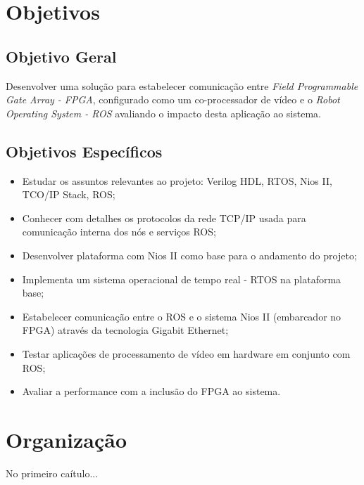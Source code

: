 \section{Objetivos}

\subsection{Objetivo Geral}

Desenvolver uma solução para estabelecer comunicação entre \textit{Field Programmable Gate Array - FPGA}, 
configurado como um co-processador de vídeo e o  \textit{Robot Operating System - ROS} avaliando 
o impacto desta aplicação ao sistema.

\subsection{Objetivos Específicos}

\begin{itemize}
    \item Estudar os assuntos relevantes ao projeto: Verilog HDL, RTOS, Nios II, TCO/IP Stack, ROS;
    \item Conhecer com detalhes os protocolos da rede TCP/IP usada para comunicação interna dos nós e serviços ROS;
    \item Desenvolver plataforma com Nios II como base para o andamento do projeto;
    \item Implementa um sistema operacional de tempo real - RTOS na plataforma base;
    \item Estabelecer comunicação entre o ROS e o sistema Nios II (embarcador no FPGA) através da tecnologia Gigabit Ethernet;
    \item Testar aplicações de processamento de vídeo em hardware em conjunto com ROS;
    \item Avaliar a performance com a inclusão do FPGA ao sistema.
\end{itemize}


\section{Organização}

 No primeiro caítulo...